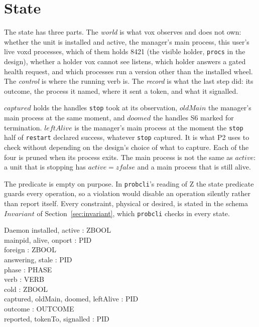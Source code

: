 \documentclass[a4paper,10pt,fleqn]{article}
\begin{document}
\section{State}
\label{sec:state}

The state has three parts. The \emph{world} is what vox observes and does not
own: whether the unit is installed and active, the manager's main process,
this user's live voxd processes, which of them holds 8421 (the visible holder,
\texttt{procs} in the design), whether a holder vox cannot see listens, which
holder answers a gated health request, and which processes run a version other
than the installed wheel. The \emph{control} is where the running verb is. The
\emph{record} is what the last step did: its outcome, the process it named,
where it sent a token, and what it signalled.

$captured$ holds the handles \texttt{stop} took at its observation, $oldMain$
the manager's main process at the same moment, and $doomed$ the handles S6
marked for termination. $leftAlive$ is the manager's main process at the
moment the \texttt{stop} half of \texttt{restart} declared success, whatever
\texttt{stop} captured. It is what P2 uses to check without depending on the
design's choice of what to capture. Each of the four is pruned when its
process exits. The main process is not the same as $active$: a unit that is
stopping has $active = zfalse$ and a main process that is still alive.

The predicate is empty on purpose. In \texttt{probcli}'s reading of Z the
state predicate guards every operation, so a violation would disable an
operation silently rather than report itself. Every constraint, physical or
desired, is stated in the schema $Invariant$ of
Section~\ref{sec:invariant}, which \texttt{probcli} checks in every state.

\begin{schema}{Daemon}
  installed, active : ZBOOL \\
  mainpid, alive, onport : \power PID \\
  foreign : ZBOOL \\
  answering, stale : \power PID \\
  phase : PHASE \\
  verb : VERB \\
  cold : ZBOOL \\
  captured, oldMain, doomed, leftAlive : \power PID \\
  outcome : OUTCOME \\
  reported, tokenTo, signalled : \power PID
\end{schema}
\end{document}
